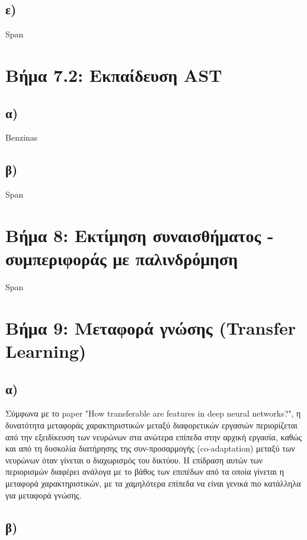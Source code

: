 \documentclass[a4paper,12pt]{article}
\begin{document}
\subsection*{ε)}

Span

\section*{Βήμα 7.2: Εκπαίδευση AST}


\subsection*{α)}

Benzinas


\subsection*{β)}

Span

\section*{Βήμα 8: Εκτίμηση συναισθήματος - συμπεριφοράς με παλινδρόμηση}

Span

\section*{Βήμα 9: Μεταφορά γνώσης (Transfer Learning)}

\subsection*{α)}

Σύμφωνα με το paper "How transferable are features in deep neural networks?", 
η δυνατότητα μεταφοράς χαρακτηριστικών μεταξύ διαφορετικών εργασιών περιορίζεται από 
την εξειδίκευση των νευρώνων στα ανώτερα επίπεδα στην αρχική εργασία, καθώς και από τη 
δυσκολία διατήρησης της συν-προσαρμογής (co-adaptation) μεταξύ των νευρώνων όταν γίνεται 
ο διαχωρισμός του δικτύου. Η επίδραση αυτών των περιορισμών διαφέρει ανάλογα με το βάθος 
των επιπέδων από τα οποία γίνεται η μεταφορά χαρακτηριστικών, με τα χαμηλότερα επίπεδα 
να είναι γενικά πιο κατάλληλα για μεταφορά γνώσης.

\subsection*{β)}
\end{document}
